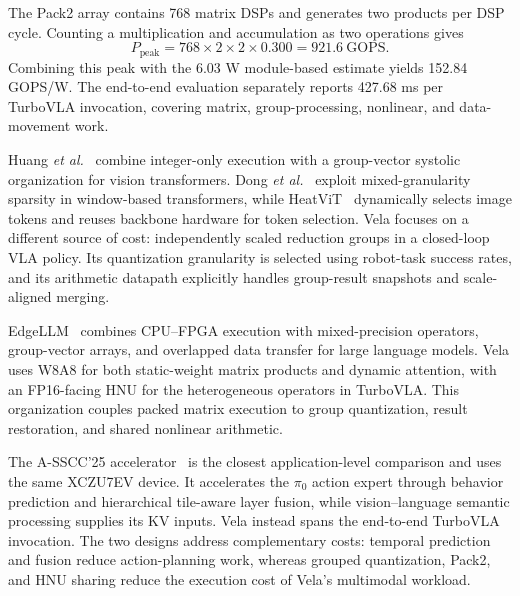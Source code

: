 \documentclass[journal,10pt]{IEEEtran}
\begin{document}
The Pack2 array contains 768 matrix DSPs and generates two products per DSP cycle. Counting a multiplication and accumulation as two operations gives
\begin{equation}
P_{\mathrm{peak}}=768\times2\times2\times0.300=921.6\ \mathrm{GOPS}.
\end{equation}
Combining this peak with the 6.03 W module-based estimate yields 152.84 GOPS/W. The end-to-end evaluation separately reports 427.68 ms per TurboVLA invocation, covering matrix, group-processing, nonlinear, and data-movement work.

Huang \emph{et al.}~\cite{huang2023integer} combine integer-only execution with a group-vector systolic organization for vision transformers. Dong \emph{et al.}~\cite{dong2025window} exploit mixed-granularity sparsity in window-based transformers, while HeatViT~\cite{dong2023heatvit} dynamically selects image tokens and reuses backbone hardware for token selection. Vela focuses on a different source of cost: independently scaled reduction groups in a closed-loop VLA policy. Its quantization granularity is selected using robot-task success rates, and its arithmetic datapath explicitly handles group-result snapshots and scale-aligned merging.

EdgeLLM~\cite{huang2025edgellm} combines CPU--FPGA execution with mixed-precision operators, group-vector arrays, and overlapped data transfer for large language models. Vela uses W8A8 for both static-weight matrix products and dynamic attention, with an FP16-facing HNU for the heterogeneous operators in TurboVLA. This organization couples packed matrix execution to group quantization, result restoration, and shared nonlinear arithmetic.

The A-SSCC'25 accelerator~\cite{ma2025planner} is the closest application-level comparison and uses the same XCZU7EV device. It accelerates the $\pi_0$ action expert through behavior prediction and hierarchical tile-aware layer fusion, while vision--language semantic processing supplies its KV inputs. Vela instead spans the end-to-end TurboVLA invocation. The two designs address complementary costs: temporal prediction and fusion reduce action-planning work, whereas grouped quantization, Pack2, and HNU sharing reduce the execution cost of Vela's multimodal workload.
\end{document}
